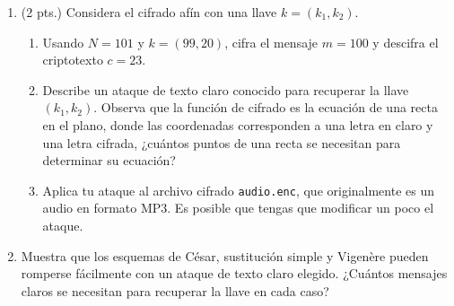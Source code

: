 \documentclass[11pt]{article} %
\begin{document}
\begin{enumerate}
		\item (2 pts.) Considera el cifrado afín con una llave $ k = (k_1, k_2) $.
		\begin{enumerate}
			\item Usando $ N = 101 $ y $ k=(99,20) $, cifra el mensaje $ m = 100 $ y descifra el criptotexto $ c = 23 $.
			\item Describe un ataque de texto claro conocido para recuperar la llave $ (k_1, k_2) $. Observa que la función de cifrado es la ecuación de una recta en el plano, donde las coordenadas corresponden a una letra en claro y una letra cifrada, ¿cuántos puntos de una recta se necesitan para determinar su ecuación?
			\item Aplica tu ataque al archivo cifrado \texttt{audio.enc}, que originalmente es un audio en formato MP3. Es posible que tengas que modificar un poco el ataque.
		\end{enumerate}
	
		\item Muestra que los esquemas de César, sustitución simple y Vigenère pueden romperse fácilmente con un ataque de texto claro elegido. ¿Cuántos mensajes claros se necesitan para recuperar la llave en cada caso?
	\end{enumerate}
\end{document}
